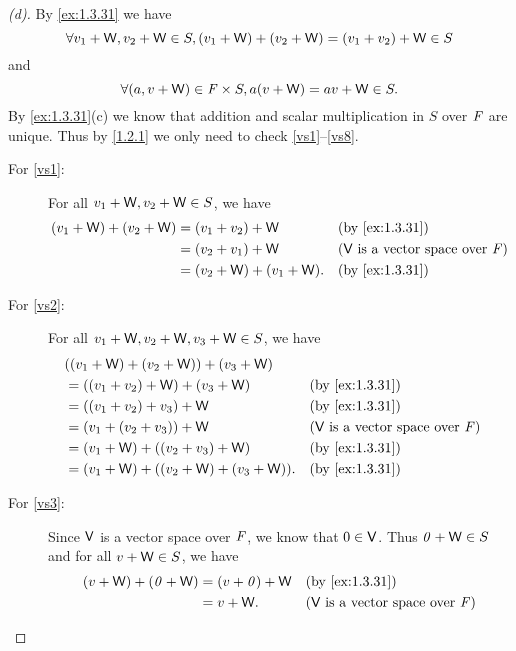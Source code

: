 \begin{proof}[(d)]
	By \cref{ex:1.3.31} we have
	\[
		\forall v_1 + \mathsf{W}, v_2 + \mathsf{W} \in S, (v_1 + \mathsf{W}) + (v_2 + \mathsf{W}) = (v_1 + v_2) + \mathsf{W} \in S
	\]
	and
	\[
		\forall (a, v + \mathsf{W}) \in \mathit{F} \times S, a(v + \mathsf{W}) = av + \mathsf{W} \in S.
	\]
	By \cref{ex:1.3.31}(c) we know that addition and scalar multiplication in \(S\) over \(\mathit{F}\) are unique.
	Thus by \cref{1.2.1} we only need to check \ref{vs1}--\ref{vs8}.
	\begin{description}
		\item[For \ref{vs1}:]
			For all \(v_1 + \mathsf{W}, v_2 + \mathsf{W} \in S\), we have
			\begin{align*}
				(v_1 + \W) + (v_2 + \W) & = (v_1 + v_2) + \W         &  & \by{ex:1.3.31}                                \\
				                        & = (v_2 + v_1) + \W         &  & \text{(\(\V\) is a vector space over \(\F\))} \\
				                        & = (v_2 + \W) + (v_1 + \W). &  & \by{ex:1.3.31}
			\end{align*}
		\item[For \ref{vs2}:]
			For all \(v_1 + \mathsf{W}, v_2 + \mathsf{W}, v_3 + \mathsf{W} \in S\), we have
			\begin{align*}
				 & ((v_1 + \W) + (v_2 + \W)) + (v_3 + \W)                                                       \\
				 & = ((v_1 + v_2) + \W) + (v_3 + \W)         &  & \by{ex:1.3.31}                                \\
				 & = ((v_1 + v_2) + v_3) + \W                &  & \by{ex:1.3.31}                                \\
				 & = (v_1 + (v_2 + v_3)) + \W                &  & \text{(\(\V\) is a vector space over \(\F\))} \\
				 & = (v_1 + \W) + ((v_2 + v_3) + \W)         &  & \by{ex:1.3.31}                                \\
				 & = (v_1 + \W) + ((v_2 + \W) + (v_3 + \W)). &  & \by{ex:1.3.31}
			\end{align*}
		\item[For \ref{vs3}:]
			Since \(\mathsf{V}\) is a vector space over \(\mathit{F}\), we know that \(0 \in \mathsf{V}\).
			Thus \(\mathit{0} + \mathsf{W} \in S\) and for all \(v + \mathsf{W} \in S\), we have
			\begin{align*}
				(v + \W) + (\zv + \W) & = (v + \zv) + \W &  & \by{ex:1.3.31}                                \\
				                      & = v + \W.        &  & \text{(\(\V\) is a vector space over \(\F\))}

\end{align*}
\end{description}
\end{proof}

